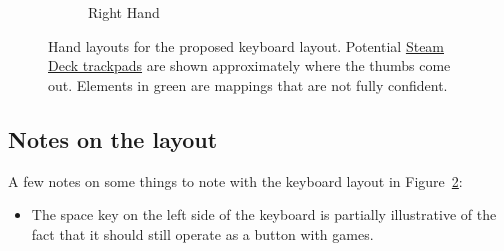 \documentclass[11pt,a4paper]{article}
\numberwithin{equation}{section}
\begin{document}
\begin{figure}[h]
\begin{subfigure}{0.495\textwidth}
        \caption{Right Hand}\label{fig:right-hand-layout}
    \end{subfigure}
    \caption{Hand layouts for the proposed keyboard layout. Potential \href{https://www.steamdeck.com/en/tech}{Steam Deck trackpads} are shown approximately where the thumbs come out. Elements in green are mappings that are not fully confident.}\label{fig:proposed-keyboard-layout}
\end{figure}

\subsection{Notes on the layout}

A few notes on some things to note with the keyboard layout in Figure~\ref{fig:proposed-keyboard-layout}:
\begin{itemize}
    \item The space key on the left side of the keyboard is partially illustrative of the fact that it should still operate as a  button with games.
\end{itemize}
\end{document}
